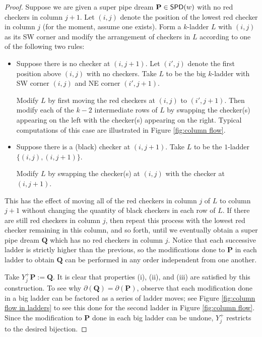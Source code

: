 \documentclass[11pt,reqno]{amsart} %
\newcommand{\bfP}{\mathbf{P}}
\newcommand{\bfQ}{\mathbf{Q}}
\DeclareMathOperator{\SPD}{\sf{SPD}}
\theoremstyle{definition}
\begin{document}
\begin{proof}
Suppose we are given a super pipe dream $\bfP\in \SPD(w)$ with no red checkers in column $j+1$.
Let $(i,j)$ denote the position of the lowest red checker in column $j$ (for the moment, assume one exists).
Form a $k$-ladder $L$ with $(i,j)$ as its SW corner and modify the arrangement of checkers in $L$ according to one of the following two rules:
\begin{itemize}
    \item[$\lozenge$]
    Suppose there is no checker at $(i,j+1)$.
    Let $(i',j)$ denote the first position above $(i,j)$ with no checkers.
    Take $L$ to be the big $k$-ladder with SW corner $(i,j)$ and NE corner $(i',j+1)$.
    
    Modify $L$ by first moving the red checkers at $(i,j)$ to $(i',j+1)$.
    Then modify each of the $k-2$ intermediate rows of $L$ by swapping the checker(s) appearing on the left with the checker(s) appearing on the right.
    Typical computations of this case are illustrated in Figure \ref{fig:column flow}.
    
    \item[$\blacklozenge$]
    Suppose there is a (black) checker at $(i,j+1)$.
    Take $L$ to be the $1$-ladder $\{(i,j),(i,j+1)\}$.

    Modify $L$ by swapping the checker(s) at $(i,j)$ with the checker at $(i,j+1)$.
\end{itemize}
This has the effect of moving all of the red checkers in column $j$ of $L$ to column $j+1$ without changing the quantity of black checkers in each row of $L$.
If there are still red checkers in column $j$, then repeat this process with the lowest red checker remaining in this column, and so forth, until we eventually obtain a super pipe dream $\bfQ$ which has no red checkers in column $j$.
Notice that each successive ladder is strictly higher than the previous, so the modifications done to $\bfP$ in each ladder to obtain $\bfQ$ can be performed in any order independent from one another.

Take $Y^+_j\bfP := \bfQ$.
It is clear that properties (i), (ii), and (iii) are satisfied by this construction.
To see why $\partial(\bfQ) = \partial(\bfP)$, observe that each modification done in a big ladder can be factored as a series of ladder moves; see Figure \ref{fig:column flow in ladders} to see this done for the second ladder in Figure \ref{fig:column flow}.
Since the modification to $\bfP$ done in each big ladder can be undone, $Y^+_j$ restricts to the desired bijection.
\end{proof}
\end{document}
